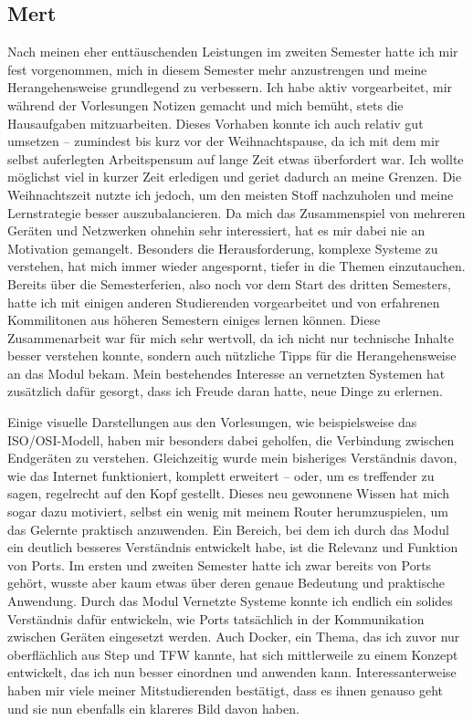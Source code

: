 \subsection{Mert}
Nach meinen eher enttäuschenden Leistungen im zweiten Semester hatte ich mir fest vorgenommen, mich in diesem Semester mehr anzustrengen und meine Herangehensweise grundlegend zu verbessern. Ich habe aktiv vorgearbeitet, mir während der Vorlesungen Notizen gemacht und mich bemüht, stets die Hausaufgaben mitzuarbeiten. Dieses Vorhaben konnte ich auch relativ gut umsetzen – zumindest bis kurz vor der Weihnachtspause, da ich mit dem mir selbst auferlegten Arbeitspensum auf lange Zeit etwas überfordert war. Ich wollte möglichst viel in kurzer Zeit erledigen und geriet dadurch an meine Grenzen. Die Weihnachtszeit nutzte ich jedoch, um den meisten Stoff nachzuholen und meine Lernstrategie besser auszubalancieren. Da mich das Zusammenspiel von mehreren Geräten und Netzwerken ohnehin sehr interessiert, hat es mir dabei nie an Motivation gemangelt. Besonders die Herausforderung, komplexe Systeme zu verstehen, hat mich immer wieder angespornt, tiefer in die Themen einzutauchen. Bereits über die Semesterferien, also noch vor dem Start des dritten Semesters, hatte ich mit einigen anderen Studierenden vorgearbeitet und von erfahrenen Kommilitonen aus höheren Semestern einiges lernen können. Diese Zusammenarbeit war für mich sehr wertvoll, da ich nicht nur technische Inhalte besser verstehen konnte, sondern auch nützliche Tipps für die Herangehensweise an das Modul bekam. Mein bestehendes Interesse an vernetzten Systemen hat zusätzlich dafür gesorgt, dass ich Freude daran hatte, neue Dinge zu erlernen. 

Einige visuelle Darstellungen aus den Vorlesungen, wie beispielsweise das ISO/OSI-Modell, haben mir besonders dabei geholfen, die Verbindung zwischen Endgeräten zu verstehen. Gleichzeitig wurde mein bisheriges Verständnis davon, wie das Internet funktioniert, komplett erweitert – oder, um es treffender zu sagen, regelrecht auf den Kopf gestellt. Dieses neu gewonnene Wissen hat mich sogar dazu motiviert, selbst ein wenig mit meinem Router herumzuspielen, um das Gelernte praktisch anzuwenden. Ein Bereich, bei dem ich durch das Modul ein deutlich besseres Verständnis entwickelt habe, ist die Relevanz und Funktion von Ports. Im ersten und zweiten Semester hatte ich zwar bereits von Ports gehört, wusste aber kaum etwas über deren genaue Bedeutung und praktische Anwendung. Durch das Modul Vernetzte Systeme konnte ich endlich ein solides Verständnis dafür entwickeln, wie Ports tatsächlich in der Kommunikation zwischen Geräten eingesetzt werden. Auch Docker, ein Thema, das ich zuvor nur oberflächlich aus Step und TFW kannte, hat sich mittlerweile zu einem Konzept entwickelt, das ich nun besser einordnen und anwenden kann. Interessanterweise haben mir viele meiner Mitstudierenden bestätigt, dass es ihnen genauso geht und sie nun ebenfalls ein klareres Bild davon haben. 

